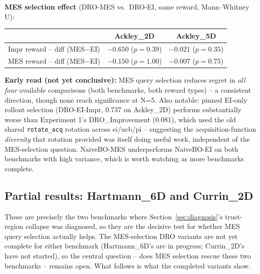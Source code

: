\documentclass[11pt]{article}
\begin{document}
\textbf{MES selection effect} (DRO-MES vs.\ DRO-EI, same reward, Mann--Whitney U):
\begin{center}
\begin{tabular}{lcc}
\toprule
& \textbf{Ackley\_2D} & \textbf{Ackley\_5D} \\
\midrule
Impr reward -- diff (MES$-$EI) & $-0.650$ ($p=0.39$) & $-0.021$ ($p=0.35$) \\
MES reward -- diff (MES$-$EI)  & $-0.150$ ($p=1.00$) & $-0.007$ ($p=0.75$) \\
\bottomrule
\end{tabular}
\end{center}

\textbf{Early read (not yet conclusive):} MES query selection reduces regret
in \emph{all four} available comparisons (both benchmarks, both reward types)
-- a consistent direction, though none reach significance at N=5. Also notable:
pinned EI-only rollout selection (DRO-EI-Impr, 0.737 on Ackley\_2D) performs
substantially worse than Experiment 1's DRO\_Improvement (0.081), which used
the old shared \texttt{rotate\_acq} rotation across ei/ucb/pi -- suggesting the
acquisition-function \emph{diversity} that rotation provided was itself doing
useful work, independent of the MES-selection question. NaiveBO-MES
underperforms NaiveBO-EI on both benchmarks with high variance, which is
worth watching as more benchmarks complete.


\subsection{Partial results: Hartmann\_6D and Currin\_2D}
\label{sec:hartmann-currin-partial}

These are precisely the two benchmarks where Section~\ref{sec:diagnosis}'s
trust-region collapse was diagnosed, so they are the decisive test for whether
MES query selection actually helps. The MES-selection DRO variants are not yet
complete for either benchmark (Hartmann\_6D's are in progress; Currin\_2D's
have not started), so the central question -- does MES selection rescue these
two benchmarks -- remains open. What follows is what the completed variants
show.
\end{document}
